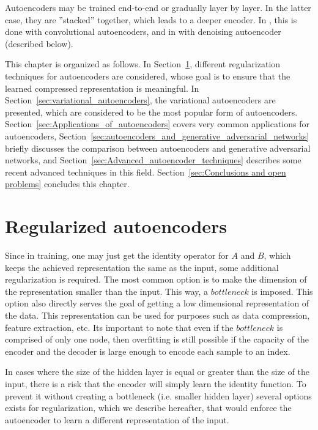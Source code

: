 \documentclass[graybox]{svmult}
\begin{document}
Autoencoders may be trained end-to-end or gradually layer by layer. In the latter case, they are ''stacked'' together, which leads to a deeper encoder. In \cite{ConvAutoEncoder}, this is done with convolutional autoencoders, and in \cite{Stacked_autoEncoders} with denoising autoencoder (described below).

This chapter is organized as follows. In Section~\ref{sec:Regularized_autoencoders}, different regularization techniques for autoencoders are considered, whose goal is to ensure that the learned compressed representation is meaningful. In Section~\ref{sec:variational_autoencoders}, the variational autoencoders are presented, which are considered to be the most popular form of autoencoders. Section~\ref{sec:Applications_of_autoencoders} covers very common applications for autoencoders, 
Section~\ref{sec:autoencoders_and_generative_adversarial_networks} briefly discusses the comparison between autoencoders and generative adversarial networks, 
and Section~\ref{sec:Advanced_autoencoder_techniques} describes some recent advanced techniques in this field. Section~\ref{sec:Conclusions and open problems} concludes this chapter.

\section{Regularized autoencoders}
\label{sec:Regularized_autoencoders}
Since in training, one may just get the identity operator for $A$ and $B$, which keeps the achieved representation the same as the input, some additional regularization is required. The most common option is to make the dimension of the representation smaller than the input. This way, a $bottleneck$ is imposed. This option also directly serves the goal of getting a low dimensional representation of the data. This representation can be used for purposes such as data compression, feature extraction, etc. Its important to note that even if the $bottleneck$ is comprised of only one node, then overfitting is still possible if the capacity of the encoder and the decoder is large enough to encode each sample to an index.

In cases where the size of the hidden layer is equal or greater than the size of the input, there is a risk that the encoder will simply learn the identity function. To prevent it without creating a bottleneck (i.e. smaller hidden layer) several options exists for regularization, which we describe hereafter, that would enforce the autoencoder to learn a different representation of the input.
\end{document}
